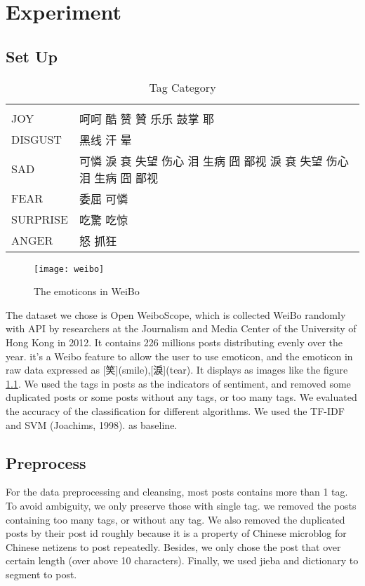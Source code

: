 \chapter{Experiment}

\section{Set Up}

\begin{table}[]
\centering
\caption{Tag Category}
\label{CategoryTable}
\begin{tabular}{ll}
      &  \\
JOY  & 呵呵 酷 赞 贊 乐乐 鼓掌 耶 \\
DISGUST & 黑线 汗 晕 \\
SAD &   可憐 淚 衰 失望 伤心 泪 生病 囧 鄙视  淚 衰 失望 伤心 泪 生病 囧 鄙视  \\
FEAR &  委屈  可憐 \\
SURPRISE &  吃驚 吃惊 \\
ANGER & 怒 抓狂
\end{tabular}
\end{table}

\begin{figure}[h]
    \centering
	\texttt{[image: weibo]}
    \caption{The emoticons in WeiBo}
    \label{fig:weibo}
\end{figure}

The dataset we chose is Open WeiboScope\cite{fu2013reality}, which is collected WeiBo randomly with API by researchers at the Journalism and Media Center of the University of Hong Kong in 2012. 
It contains 226 millions posts distributing evenly over the year. 
it's a Weibo feature to allow the user to use emoticon, 
and the emoticon in raw data expressed as [笑](smile),[淚](tear). It displays as images like the figure \ref{fig:weibo}. 
We used the tags in posts as the indicators of sentiment, and removed some duplicated posts or some posts without any tags, or too many tags. 
We evaluated the accuracy of the classification for different algorithms. We used the TF-IDF and SVM (Joachims, 1998). as baseline.


\section{Preprocess}

For the data preprocessing and cleansing, most posts contains more than 1 tag. To avoid ambiguity, we only preserve those with single tag.
we removed the posts containing too many tags, or without any tag. We also removed the duplicated posts by their post id roughly because it is a property of Chinese microblog \cite{fu2013reality} for Chinese netizens to post repeatedly. 
Besides, we only chose the post that over certain length (over above 10 characters). Finally, we used jieba and dictionary to segment to post. \\

